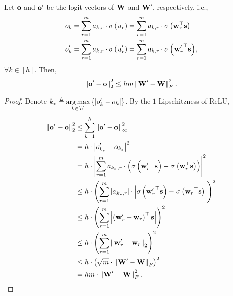 \begin{lem}
\label{lem:logit_upper_bound_parameter}
Let ${\mathbf{o}}$ and ${\mathbf{o}}^\prime$ be the logit vectors of  ${\mathbf{W}}$ and ${\mathbf{W}}^\prime$, respectively, i.e.,
\begin{equation*}
\begin{split}
    &o_{k} = \sum\limits_{r=1}^{m}{ a_{k,r} \cdot \sigma\left( u_{r} \right)} = \sum\limits_{r=1}^{m}{ a_{k,r} \cdot \sigma\left({\mathbf{w}}_r^\top {\mathbf{s}} \right)} \\
    &o_{k}^\prime = \sum\limits_{r=1}^{m}{ a_{k,r} \cdot \sigma\left( u_{r}^\prime \right)} = \sum\limits_{r=1}^{m}{ a_{k,r} \cdot \sigma\left({{\mathbf{w}}_r^\prime}^\top {\mathbf{s}} \right)},
\end{split}
\end{equation*}
$\forall k \in [h]$. Then,
\begin{equation*}
\begin{split}
    \left\| {\mathbf{o}}^\prime - {\mathbf{o}} \right\|_2^2 \le h m \left\| {\mathbf{W}}^\prime - {\mathbf{W}} \right\|_F^2.
\end{split}
\end{equation*}
\end{lem}
\begin{proof}
Denote $k_* \triangleq \operatorname*{arg\,max}\limits_{k \in [h]}\left\{ \left| o_{k}^\prime - o_{k} \right| \right\}$. By the $1$-Lipschitzness of ReLU,
\begin{equation*}
\begin{split}
    \left\| {\mathbf{o}}^\prime - {\mathbf{o}} \right\|_2^2 &\le \sum\limits_{k = 1}^{h}{ \left\| {\mathbf{o}}^\prime - {\mathbf{o}} \right\|_\infty^2} \\
    &= h \cdot \left| o_{k_*}^\prime - o_{k_*} \right|^2 \\
    &= h \cdot \left| \sum\limits_{r=1}^{m}{ a_{k_*,r} \cdot \left( \sigma\left({{\mathbf{w}}_r^\prime}^\top {\mathbf{s}} \right) - \sigma\left({\mathbf{w}}_r^\top {\mathbf{s}} \right) \right)} \right|^2 \\
    &\le h \cdot \left( \sum\limits_{r=1}^{m}{ \left| a_{k_*,r} \right| \cdot \left| \sigma\left({{\mathbf{w}}_r^\prime}^\top {\mathbf{s}}\right) - \sigma\left({{\mathbf{w}}_r}^\top {\mathbf{s}}\right) \right|  } \right)^2 \\
    &\le h \cdot \left( \sum\limits_{r=1}^{m}{ \left| \left({{\mathbf{w}}_r^\prime} - {\mathbf{w}}_r \right)^\top {\mathbf{s}}\right|  } \right)^2 \\
    &\le h \cdot \left( \sum\limits_{r=1}^{m}{ \left\| {{\mathbf{w}}_r^\prime} - {\mathbf{w}}_r \right\|_2  } \right)^2 \\
    &\le h \cdot \left( \sqrt{m} \cdot \left\| {\mathbf{W}}^\prime - {\mathbf{W}} \right\|_F \right)^2 \\
    &= h m \cdot \left\| {\mathbf{W}}^\prime - {\mathbf{W}} \right\|_F^2. \qedhere
\end{split}
\end{equation*}
\end{proof}

